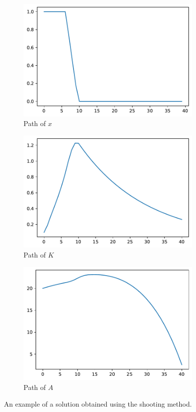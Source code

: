 \documentclass[12pt]{article}
\begin{document}
\begin{figure}[h]
    \begin{subfigure}{.5\textwidth}
      \centering
      \includegraphics[width=.8\linewidth]{../../output/shooting_x_path.pdf}  
      \caption{Path of $x$}
      \label{fig:x_path}
    \end{subfigure}
    \begin{subfigure}{.5\textwidth}
      \centering
      \includegraphics[width=.8\linewidth]{../../output/shooting_K_path.pdf}  
      \caption{Path of $K$}
      \label{fig:h_path}
    \end{subfigure}

    \begin{subfigure}{.5\textwidth}
        \centering
        \includegraphics[width=.8\linewidth]{../../output/shooting_A_path.pdf}  
        \caption{Path of $A$}
        \label{fig:x_path}
    \end{subfigure}
    \caption{An example of a solution obtained using the shooting method.}
    \label{fig:shooting_solution}
\end{figure}
\end{document}
